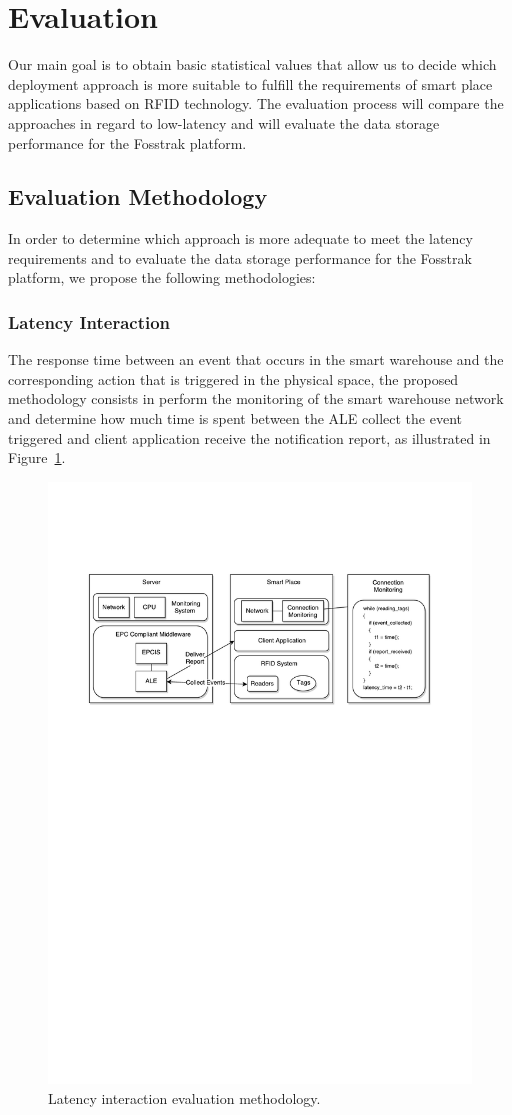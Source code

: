 
\section{Evaluation}
\label{sec:evaluation}
Our main goal is to obtain basic statistical values that allow us to decide which deployment
approach is more suitable to fulfill the requirements of smart place applications based on \gls{RFID}
technology. The evaluation process will compare the approaches in regard to low-latency and will
evaluate the data storage performance for the Fosstrak platform.

\subsection{Evaluation Methodology}
\label{sub:eval_methodology}
In order to determine which approach is more adequate to meet the latency requirements and to
evaluate the data storage performance for the Fosstrak platform, we propose the following
methodologies:\\

\subsubsection{Latency Interaction}
\label{sub:eval_methodology_latency}
The response time between an event that occurs in the smart warehouse and the corresponding action
that is triggered in the physical space, the proposed methodology consists in perform the monitoring
of the smart warehouse network and determine how much time is spent between the \gls{ALE} collect the
event triggered and client application receive the notification report, as illustrated in
Figure~\ref{fig:eval_latency_methodology}.

\begin{figure}[ht!]
  \centering
  \includegraphics[width=.5\textwidth]{./figures/eval_latency_methodology}
  \caption[Latency evaluation methodology.]{Latency interaction evaluation methodology.}
  \label{fig:eval_latency_methodology}
\end{figure}

